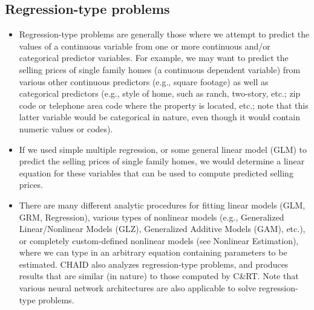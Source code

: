 \documentclass[caret-main.tex]{subfiles}
\begin{document}
\subsection{Regression-type problems} 
\begin{itemize}
\item Regression-type problems are generally those where we attempt to predict the values of a continuous variable from one or more continuous and/or categorical predictor variables. For example, we may want to predict the selling prices of single family homes (a continuous dependent variable) from various other continuous predictors (e.g., square footage) as well as categorical predictors (e.g., style of home, such as ranch, two-story, etc.; zip code or telephone area code where the property is located, etc.; note that this latter variable would be categorical in nature, even though it would contain numeric values or codes). 
\item If we used simple multiple regression, or some general linear model (GLM) to predict the selling prices of single family homes, we would determine a linear equation for these variables that can be used to compute predicted selling prices. 
\item There are many different analytic procedures for fitting linear models (GLM, GRM, Regression), various types of nonlinear models (e.g., Generalized Linear/Nonlinear Models (GLZ), Generalized Additive Models (GAM), etc.), or completely custom-defined nonlinear models (see Nonlinear Estimation), where we can type in an arbitrary equation containing parameters to be estimated. CHAID also analyzes regression-type problems, and produces results that are similar (in nature) to those computed by C\&RT. Note that various neural network architectures are also applicable to solve regression-type problems.
\end{itemize}
\end{document}
